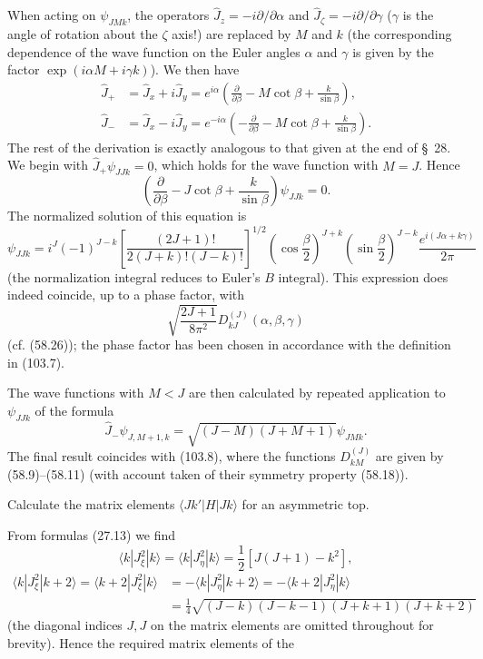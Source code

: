 When acting on $\psi_{JMk}$, the operators $\hat J_z=-i\partial/\partial\alpha$ and $\hat J_\zeta=-i\partial/\partial\gamma$ ($\gamma$ is the angle of rotation about the $\zeta$ axis!) are replaced by $M$ and $k$ (the corresponding dependence of the wave function on the Euler angles $\alpha$ and $\gamma$ is given by the factor $\exp(i\alpha M+i\gamma k)$). We then have
\[
\begin{aligned}
 \hat J_+&=\hat J_x+i\hat J_y=e^{i\alpha}\left(\frac{\partial}{\partial\beta}-M\cot\beta+\frac{k}{\sin\beta}\right),\\
 \hat J_-&=\hat J_x-i\hat J_y=e^{-i\alpha}\left(-\frac{\partial}{\partial\beta}-M\cot\beta+\frac{k}{\sin\beta}\right).
\end{aligned}
\]
The rest of the derivation is exactly analogous to that given at the end of \S~28. We begin with $\hat J_+\psi_{JJk}=0$, which holds for the wave function with $M=J$. Hence
\[
 \left(\frac{\partial}{\partial\beta}-J\cot\beta+\frac{k}{\sin\beta}\right)\psi_{JJk}=0.
\]
The normalized solution of this equation is
\[
 \psi_{JJk}=i^J(-1)^{J-k}\left[\frac{(2J+1)!}{2(J+k)!(J-k)!}\right]^{1/2}
 \left(\cos\frac\beta2\right)^{J+k}\left(\sin\frac\beta2\right)^{J-k}
 \frac{e^{i(J\alpha+k\gamma)}}{2\pi}
\]
(the normalization integral reduces to Euler's $B$ integral). This expression does indeed coincide, up to a phase factor, with
\[
 \sqrt{\frac{2J+1}{8\pi^2}}D_{kJ}^{(J)}(\alpha,\beta,\gamma)
\]
(cf. (58.26)); the phase factor has been chosen in accordance with the definition in (103.7).

The wave functions with $M<J$ are then calculated by repeated application to $\psi_{JJk}$ of the formula
\[
 \hat J_-\psi_{J,M+1,k}=\sqrt{(J-M)(J+M+1)}\psi_{JMk}.
\]
The final result coincides with (103.8), where the functions $D_{kM}^{(J)}$ are given by (58.9)--(58.11) (with account taken of their symmetry property (58.18)).

 Calculate the matrix elements $\langle Jk'|H|Jk\rangle$ for an asymmetric top.

\SolutionHeading From formulas (27.13) we find
\[
 \langle k|J_\xi^2|k\rangle=\langle k|J_\eta^2|k\rangle=\frac12[J(J+1)-k^2],
\]
\[
\begin{aligned}
 \langle k|J_\xi^2|k+2\rangle=\langle k+2|J_\xi^2|k\rangle
 &=-\langle k|J_\eta^2|k+2\rangle=-\langle k+2|J_\eta^2|k\rangle\\
 &=\frac14\sqrt{(J-k)(J-k-1)(J+k+1)(J+k+2)}
\end{aligned}
\]
(the diagonal indices $J,J$ on the matrix elements are omitted throughout for brevity). Hence the required matrix elements of the

